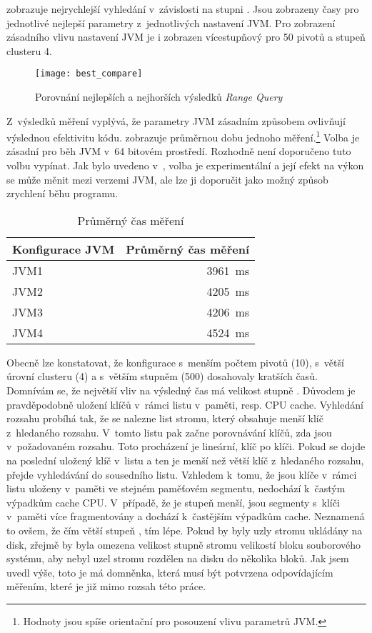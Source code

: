  zobrazuje nejrychlejší vyhledání v~závislosti na stupni \BPTree{}.
Jsou zobrazeny časy pro jednotlivé nejlepší parametry  z~jednotlivých nastavení JVM.
Pro zobrazení zásadního vlivu nastavení JVM je i zobrazen vícestupňový \MIndex{} pro \num{50} pivotů a stupeň clusteru \num{4}.

\begin{figure}[t]
\centering
\texttt{[image: best\_compare]}
\caption{Porovnání nejlepších a nejhorších výsledků \emph{Range Query}}
\label{fig:jvm1p50}
\end{figure}

Z~výsledků měření vyplývá, že parametry JVM zásadním způsobem ovlivňují výslednou efektivitu kódu.
 zobrazuje průměrnou dobu jednoho měření.\footnote{Hodnoty jsou spíše orientační pro posouzení vlivu parametrů JVM.}
Volba  je zásadní pro běh JVM v~64 bitovém prostředí.
Rozhodně není doporučeno tuto volbu vypínat.
Jak bylo uvedeno v~, volba  je experimentální a její efekt na výkon se může měnit mezi verzemi JVM, ale lze ji doporučit jako možný způsob zrychlení běhu programu.

\begin{table}[h]
\center
\begin{tabular}{| l  | r |}
\hline
Konfigurace JVM & Průměrný čas měření \\ \hline
\hline
JVM1 & \SI{3961}{\ms} \\ \hline
JVM2 & \SI{4205}{\ms} \\ \hline
JVM3 & \SI{4206}{\ms} \\ \hline
JVM4 & \SI{4524}{\ms} \\ \hline
\end{tabular}
\caption{Průměrný čas měření}
\label{tab:jvmavgtime}
\end{table}

Obecně lze konstatovat, že konfigurace s~menším počtem pivotů (\num{10}), s~větší úrovní clusteru (\num{4}) a s~větším stupněm \BPTree{} (\num{500}) dosahovaly kratších časů.
Domnívám se, že největší vliv na výsledný čas má velikost stupně \BPTree{}.
Důvodem je pravděpodobně uložení klíčů v~rámci listu v~paměti, resp. CPU cache.
Vyhledání rozsahu probíhá tak, že se nalezne list stromu, který obsahuje menší klíč z~hledaného rozsahu.
V~tomto listu pak začne porovnávání klíčů, zda jsou v~požadovaném rozsahu.
Toto procházení je lineární, klíč po klíči.
Pokud se dojde na poslední uložený klíč v~listu a ten je menší než větší klíč z~hledaného rozsahu, přejde vyhledávání do sousedního listu.
Vzhledem k~tomu, že jsou klíče v~rámci listu uloženy v~paměti ve stejném paměťovém segmentu, nedochází k~častým výpadkům cache CPU.
V~případě, že je stupeň \BPTree{} menší, jsou segmenty s~klíči v~paměti více fragmentovány a dochází k~častějším výpadkům cache.
Neznamená to ovšem, že čím větší stupeň \BPTree{}, tím lépe. 
Pokud by byly uzly stromu ukládány na disk, zřejmě by byla omezena velikost stupně stromu velikostí bloku souborového systému, aby nebyl uzel stromu rozdělen na disku do několika bloků.
Jak jsem uvedl výše, toto je má domněnka, která musí být potvrzena odpovídajícím měřením, které je již mimo rozsah této práce.

